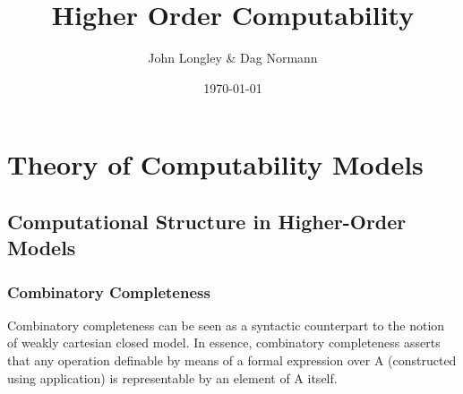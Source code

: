 \documentclass[11pt]{article}
\author{John Longley \& Dag Normann}
\date{\today}
\title{Higher Order Computability}
\begin{document}
\maketitle
\tableofcontents


\section{Theory of Computability Models}
\label{sec:orgc1593d0}
\subsection{Computational Structure in Higher-Order Models}
\label{sec:orgcea79a0}
\subsubsection{Combinatory Completeness}
\label{sec:org421566a}
Combinatory completeness can be seen as a syntactic counterpart to the notion of weakly
cartesian closed model. In essence, combinatory completeness asserts that any operation
definable by means of a formal expression over A (constructed using application) is
representable by an element of A itself.
\end{document}
